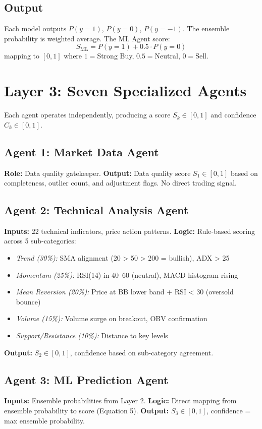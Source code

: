 \documentclass[12pt,a4paper]{report}
\begin{document}
\subsection{Output}
Each model outputs $P(y=1)$, $P(y=0)$, $P(y=-1)$. The ensemble probability is weighted average. The ML Agent score:
\begin{equation}
    S_{\text{ML}} = P(y=1) + 0.5 \cdot P(y=0)
\end{equation}
mapping to $[0, 1]$ where $1=$Strong Buy, $0.5=$Neutral, $0=$Sell.

\section{Layer 3: Seven Specialized Agents}
Each agent operates independently, producing a score $S_k \in [0, 1]$ and confidence $C_k \in [0, 1]$.

\subsection{Agent 1: Market Data Agent}
\textbf{Role:} Data quality gatekeeper.
\textbf{Output:} Data quality score $S_1 \in [0, 1]$ based on completeness, outlier count, and adjustment flags. No direct trading signal.

\subsection{Agent 2: Technical Analysis Agent}
\textbf{Inputs:} 22 technical indicators, price action patterns.
\textbf{Logic:} Rule-based scoring across 5 sub-categories:
\begin{itemize}
    \item \textit{Trend (30\%):} SMA alignment (20 > 50 > 200 = bullish), ADX > 25
    \item \textit{Momentum (25\%):} RSI(14) in 40--60 (neutral), MACD histogram rising
    \item \textit{Mean Reversion (20\%):} Price at BB lower band + RSI < 30 (oversold bounce)
    \item \textit{Volume (15\%):} Volume surge on breakout, OBV confirmation
    \item \textit{Support/Resistance (10\%):} Distance to key levels
\end{itemize}
\textbf{Output:} $S_2 \in [0, 1]$, confidence based on sub-category agreement.

\subsection{Agent 3: ML Prediction Agent}
\textbf{Inputs:} Ensemble probabilities from Layer 2.
\textbf{Logic:} Direct mapping from ensemble probability to score (Equation 5).
\textbf{Output:} $S_3 \in [0, 1]$, confidence = max ensemble probability.
\end{document}
